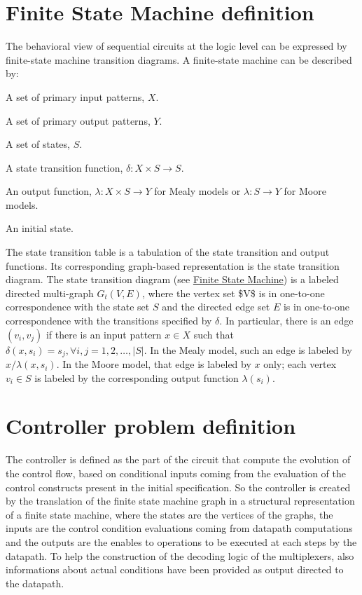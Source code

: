 \hypertarget{src_HLS_controller_fsm_finite_state_machine}{}\section{Finite State Machine definition}\label{src_HLS_controller_fsm_finite_state_machine}
The behavioral view of sequential circuits at the logic level can be expressed by finite-\/state machine transition diagrams. A finite-\/state machine can be described by\+:
\begin{DoxyItemize}
\item A set of primary input patterns, $X$.
\item A set of primary output patterns, $Y$.
\item A set of states, $S$.
\item A state transition function, $\delta : X\times S\rightarrow S$.
\item An output function, $\lambda : X\times S\rightarrow Y$ for Mealy models or $\lambda : S \rightarrow Y$ for Moore models.
\item An initial state.
\end{DoxyItemize}

The state transition table is a tabulation of the state transition and output functions. Its corresponding graph-\/based representation is the state transition diagram. The state transition diagram (see \hyperlink{src_HLS_controller_stg}{Finite State Machine}) is a labeled directed multi-\/graph $G_t(V,E)$, where the vertex set \$V\$ is in one-\/to-\/one correspondence with the state set $S$ and the directed edge set $E$ is in one-\/to-\/one correspondence with the transitions specified by $\delta$. In particular, there is an edge $(v_i,v_j)$ if there is an input pattern $x\in X$ such that $\delta(x,s_i)=s_j, \forall i,j = 1,2,\ldots ,\vert S\vert$. In the Mealy model, such an edge is labeled by $x/\lambda(x,s_i)$. In the Moore model, that edge is labeled by $x$ only; each vertex $v_i\in S$ is labeled by the corresponding output function $\lambda(s_i)$.\hypertarget{src_HLS_controller_fsm_controller_definition}{}\section{Controller problem definition}\label{src_HLS_controller_fsm_controller_definition}
The controller is defined as the part of the circuit that compute the evolution of the control flow, based on conditional inputs coming from the evaluation of the control constructs present in the initial specification. So the controller is created by the translation of the finite state machine graph in a structural representation of a finite state machine, where the states are the vertices of the graphs, the inputs are the control condition evaluations coming from datapath computations and the outputs are the enables to operations to be executed at each steps by the datapath. To help the construction of the decoding logic of the multiplexers, also informations about actual conditions have been provided as output directed to the datapath. 